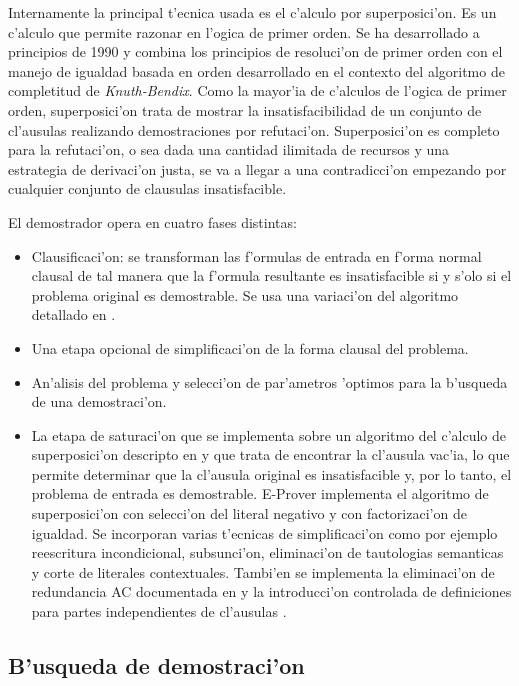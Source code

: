 Internamente la principal t'ecnica usada es el c'alculo por superposici'on. Es un c'alculo que permite razonar en l'ogica de primer orden. Se ha desarrollado a principios de 1990 y combina los principios de resoluci'on de primer orden con el manejo de igualdad basada en orden desarrollado en el contexto del algoritmo de completitud de \textit{Knuth-Bendix}\cite{knuthbendix}. Como la mayor'ia de c'alculos de l'ogica de primer orden, superposici'on trata de mostrar la insatisfacibilidad de un conjunto de cl'ausulas realizando demostraciones por refutaci'on. Superposici'on es completo para la refutaci'on, o sea dada una cantidad ilimitada de recursos y una estrategia de derivaci'on justa, se va a llegar a una contradicci'on empezando por cualquier conjunto de clausulas insatisfacible.

El demostrador opera en cuatro fases distintas:
\begin{itemize}
\item Clausificaci'on: se transforman las f'ormulas de entrada en f'orma normal clausal de tal manera que la f'ormula resultante es insatisfacible si y s'olo si el problema original es demostrable. Se usa una variaci'on del algoritmo detallado en \cite{smallcnf2001}.

\item Una etapa opcional de simplificaci'on de la forma clausal del problema.

\item An'alisis del problema y selecci'on de par'ametros 'optimos para la b'usqueda de una demostraci'on.

\item La etapa de saturaci'on que se implementa sobre un algoritmo del c'alculo de superposici'on descripto en \cite{bg94} y \cite{aicom2002} que trata de encontrar la cl'ausula vac'ia, lo que permite determinar que la cl'ausula original es insatisfacible y, por lo tanto, el problema de entrada es demostrable. E-Prover implementa el algoritmo de superposici'on con selecci'on del literal negativo y con factorizaci'on de igualdad. Se incorporan varias t'ecnicas de simplificaci'on como por ejemplo reescritura incondicional, subsunci'on, eliminaci'on de tautologias semanticas y corte de literales contextuales. Tambi'en se implementa la eliminaci'on de redundancia AC documentada en \cite{jsc2003} y la introducci'on controlada de definiciones para partes independientes de cl'ausulas \cite{ijcai2001}.
\end{itemize}

\subsection{B'usqueda de demostraci'on}

